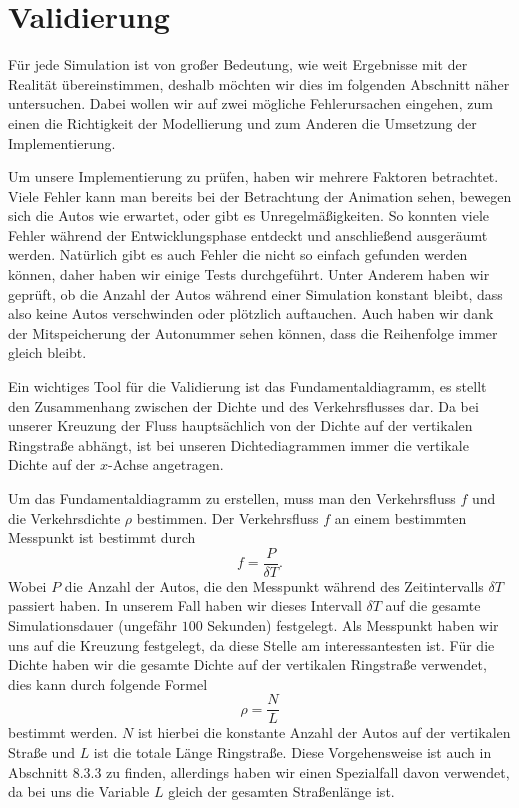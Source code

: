 \chapter{Validierung}

Für jede Simulation ist von großer Bedeutung, wie weit Ergebnisse mit der Realität übereinstimmen, deshalb möchten wir dies im folgenden Abschnitt näher untersuchen. Dabei wollen wir auf zwei mögliche Fehlerursachen eingehen, zum einen die Richtigkeit der Modellierung und zum Anderen die Umsetzung der Implementierung. 

Um unsere Implementierung zu prüfen, haben wir mehrere Faktoren betrachtet. Viele Fehler kann man bereits bei der Betrachtung der Animation sehen, bewegen sich die Autos wie erwartet, oder gibt es Unregelmäßigkeiten. So konnten viele Fehler während der Entwicklungsphase entdeckt und anschließend ausgeräumt werden. Natürlich gibt es auch Fehler die nicht so einfach gefunden werden können, daher haben wir einige Tests durchgeführt. Unter Anderem haben wir geprüft, ob die Anzahl der Autos während einer Simulation konstant bleibt, dass also keine Autos verschwinden oder plötzlich auftauchen. Auch haben wir dank der Mitspeicherung der Autonummer sehen können, dass die Reihenfolge immer gleich bleibt. 

Ein wichtiges Tool für die Validierung ist das Fundamentaldiagramm, es stellt den Zusammenhang zwischen der Dichte und des Verkehrsflusses dar. Da bei unserer Kreuzung der Fluss hauptsächlich von der Dichte auf der vertikalen Ringstraße abhängt, ist bei unseren Dichtediagrammen immer die vertikale Dichte auf der $x$-Achse angetragen. 

Um das Fundamentaldiagramm zu erstellen, muss man den Verkehrsfluss $f$ und die Verkehrsdichte $\rho$ bestimmen. Der Verkehrsfluss $f$ an einem bestimmten Messpunkt ist bestimmt durch
\[ f = \frac{P}{\delta T}. \]
Wobei $P$ die Anzahl der Autos, die den Messpunkt während des Zeitintervalls $\delta T$ passiert haben. In unserem Fall haben wir dieses Intervall $\delta T$ auf die gesamte Simulationsdauer (ungefähr $100$ Sekunden) festgelegt. Als Messpunkt haben wir uns auf die Kreuzung festgelegt, da diese Stelle am interessantesten ist. Für die Dichte haben wir die gesamte Dichte auf der vertikalen Ringstraße verwendet, dies kann durch folgende Formel
\[ \rho = \frac{N}{L} \]
bestimmt werden. $N$ ist hierbei die konstante Anzahl der Autos auf der vertikalen Straße und $L$ ist die totale Länge Ringstraße. Diese Vorgehensweise ist auch in \cite{book:bungartz} Abschnitt 8.3.3 zu finden, allerdings haben wir einen Spezialfall davon verwendet, da bei uns die Variable $L$ gleich der gesamten Straßenlänge ist.


